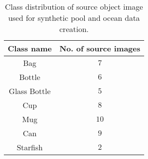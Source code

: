 \begin{table}[b!]
\caption{Class distribution of source object image used for synthetic pool and ocean data creation.}
\label{data_dist}
\begin{center}
\begin{tabular}{cc}
\hline
\toprule
    Class name & No. of source images\\
    \midrule
     Bag & $7$ \\
     Bottle & $6$ \\
     Glass Bottle & $5$ \\
     Cup & $8$ \\
     Mug & $10$ \\
     Can & $9$ \\
     Starfish & $2$ \\
\bottomrule
\end{tabular}
\end{center}
\end{table}